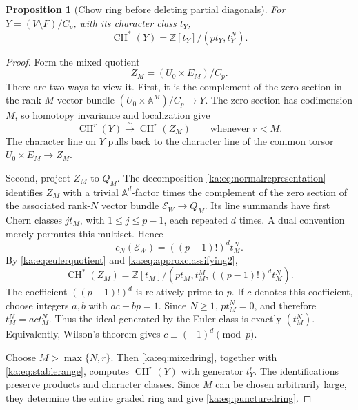 \documentclass[11pt,a4paper]{article}
\newtheorem{proposition}[theorem]{Proposition}
\theoremstyle{definition}
\theoremstyle{remark}
\newcommand{\Z}{\mathbb Z}
\newcommand{\A}{\mathbb A}
\newcommand{\EE}{\mathcal E}
\newcommand{\CH}{\operatorname{CH}}
\begin{document}
\begin{proposition}[Chow ring before deleting partial diagonals]
\label{ka:prop:punctured}
For $Y=(V\setminus F)/C_p$, with its character class $t_Y$,
\begin{equation}
 \CH^*(Y)=\Z[t_Y]/(pt_Y,t_Y^N).
 \label{ka:eq:puncturedring}
\end{equation}
\end{proposition}
\begin{proof}
Form the mixed quotient
\[
 Z_M=(U_0\times E_M)/C_p.
\]
There are two ways to view it. First, it is the complement of the zero
section in the rank-$M$ vector bundle
$(U_0\times\A^M)/C_p\to Y$. The zero section has codimension $M$,
so homotopy invariance and localization give
\begin{equation}
 \CH^r(Y)\xrightarrow{\sim}\CH^r(Z_M)
 \qquad\text{whenever }r<M.
 \label{ka:eq:stablerange}
\end{equation}
The character line on $Y$ pulls back to the character line of the
common torsor $U_0\times E_M\to Z_M$.

Second, project $Z_M$ to $Q_M$. The decomposition
\eqref{ka:eq:normalrepresentation} identifies $Z_M$ with a trivial
$\A^d$-factor times the complement of the zero section of the associated
rank-$N$ vector bundle $\EE_W\to Q_M$. Its line summands have first
Chern classes $j t_M$, with $1\leq j\leq p-1$, each repeated $d$ times.
A dual convention merely permutes this multiset. Hence
\begin{equation}
 c_N(\EE_W)=\left((p-1)!\right)^d t_M^N.
 \label{ka:eq:euler}
\end{equation}
By \eqref{ka:eq:eulerquotient} and \eqref{ka:eq:approxclassifying2},
\begin{equation}
 \CH^*(Z_M)
 =\Z[t_M]/\left(pt_M,t_M^M,((p-1)!)^d t_M^N\right).
 \label{ka:eq:mixedring}
\end{equation}
The coefficient $((p-1)!)^d$ is relatively prime to $p$. If $c$ denotes
this coefficient, choose integers $a,b$ with $ac+bp=1$. Since $N\geq1$,
$pt_M^N=0$, and therefore $t_M^N=a c t_M^N$. Thus the ideal generated
by the Euler class is exactly $(t_M^N)$. Equivalently, Wilson's theorem
gives $c\equiv(-1)^d\pmod p$.

Choose $M>\max\{N,r\}$. Then \eqref{ka:eq:mixedring}, together with
\eqref{ka:eq:stablerange}, computes $\CH^r(Y)$ with generator $t_Y^r$.
The identifications preserve products and character classes. Since $M$
can be chosen arbitrarily large, they determine the entire graded ring
and give \eqref{ka:eq:puncturedring}.
\end{proof}
\end{document}
